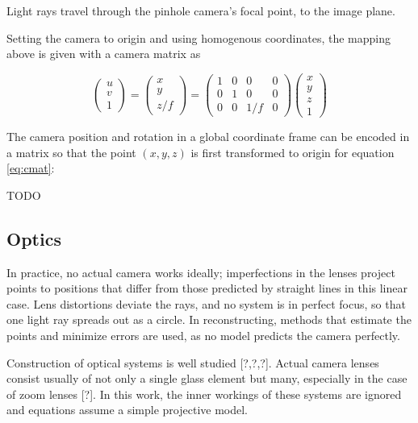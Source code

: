 Light rays travel through the pinhole camera's focal point, to the image plane.

Setting the camera to origin and using homogenous coordinates, the mapping above is given with a camera matrix as

\begin{equation}
\begin{pmatrix}
u \\ v \\ 1
\end{pmatrix}
=
\begin{pmatrix}
x \\ y \\ z/f
\end{pmatrix}
=
\begin{pmatrix} \label{eq:cmat}
	1 & 0 & 0 & 0 \\
	0 & 1 & 0 & 0 \\
	0 & 0 & 1/f & 0
\end{pmatrix}
\begin{pmatrix}
x \\ y \\ z \\ 1
\end{pmatrix}
\end{equation}

The camera position and rotation in a global coordinate frame can be encoded in a matrix so that the point $(x,y,z)$ is first transformed to origin for equation \ref{eq:cmat}:

TODO

\subsection{Optics}

In practice, no actual camera works ideally; imperfections in the lenses project points to positions that differ from those predicted by straight lines in this linear case. Lens distortions deviate the rays, and no system is in perfect focus, so that one light ray spreads out as a circle. In reconstructing, methods that estimate the points and minimize errors are used, as no model predicts the camera perfectly.

Construction of optical systems is well studied [?,?,?]. Actual camera lenses consist usually of not only a single glass element but many, especially in the case of zoom lenses [?]. In this work, the inner workings of these systems are ignored and equations assume a simple projective model.

